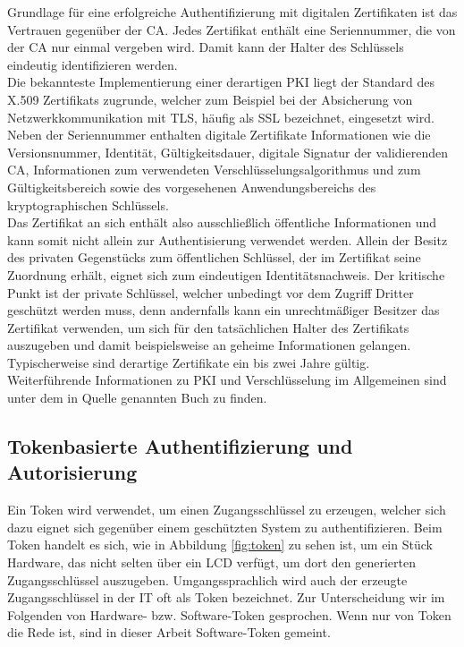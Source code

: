 \documentclass[
book,
a4paper,   
titlepage,  
halfparskip,
12pt        
]{scrartcl}
\begin{document}
\begin{onehalfspacing}
Grundlage für eine erfolgreiche Authentifizierung mit digitalen Zertifikaten ist das Vertrauen gegenüber der \ac{CA}. Jedes Zertifikat enthält eine Seriennummer, die von der \ac{CA} nur einmal vergeben wird. Damit kann der Halter des Schlüssels eindeutig identifizieren werden.\\
Die bekannteste Implementierung einer derartigen \ac{PKI} liegt der Standard des X.509 Zertifikats zugrunde, welcher zum Beispiel bei der Absicherung von Netzwerkkommunikation mit \ac{TLS}, häufig als \ac{SSL} bezeichnet, eingesetzt wird. Neben der Seriennummer enthalten digitale Zertifikate Informationen wie die Versionsnummer, Identität, Gültigkeitsdauer, digitale Signatur der validierenden \ac{CA}, Informationen zum verwendeten Verschlüsselungsalgorithmus und zum Gültigkeitsbereich sowie des vorgesehenen Anwendungsbereichs des kryptographischen Schlüssels.\cite[S. 144]{kerberos2}\\
Das Zertifikat an sich enthält also ausschließlich öffentliche Informationen und kann somit nicht allein zur Authentisierung verwendet werden. Allein der Besitz des privaten Gegenstücks zum öffentlichen Schlüssel, der im Zertifikat seine Zuordnung erhält, eignet sich zum eindeutigen Identitätsnachweis. Der kritische Punkt ist der private Schlüssel, welcher unbedingt vor dem Zugriff Dritter geschützt werden muss, denn andernfalls kann ein unrechtmäßiger Besitzer das Zertifikat verwenden, um sich für den tatsächlichen Halter des Zertifikats auszugeben und damit beispielsweise an geheime Informationen gelangen. Typischerweise sind derartige Zertifikate ein bis zwei Jahre gültig.\cite[S. 145f]{kerberos2}\\
Weiterführende Informationen zu \ac{PKI} und Verschlüsselung im Allgemeinen sind unter dem in Quelle \cite{crypto} genannten Buch zu finden.

\subsection{Tokenbasierte Authentifizierung und Autorisierung}
\label{subsec:token}
Ein Token wird verwendet, um einen Zugangsschlüssel zu erzeugen, welcher sich dazu eignet sich gegenüber einem geschützten System zu authentifizieren. Beim Token handelt es sich, wie in Abbildung \vref{fig:token} zu sehen ist, um ein Stück Hardware, das nicht selten über ein \ac{LCD} verfügt, um dort den generierten Zugangsschlüssel auszugeben. Umgangssprachlich wird auch der erzeugte Zugangsschlüssel in der \ac{IT} oft als Token bezeichnet. Zur Unterscheidung wir im Folgenden von Hardware- bzw. Software-Token gesprochen. Wenn nur von Token die Rede ist, sind in dieser Arbeit Software-Token gemeint.\cite[S.141ff]{kerberos2}


\end{onehalfspacing}
\end{document}
